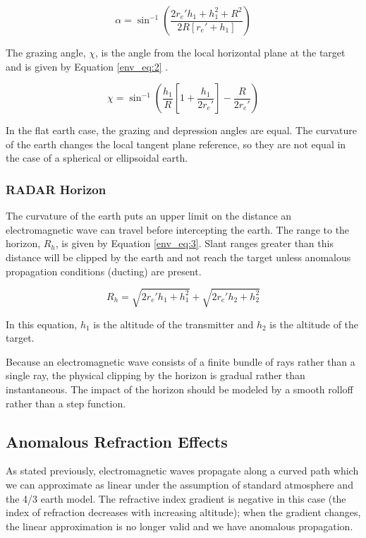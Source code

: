 \begin{equation}
  \label{env_eq:1}
  \alpha = \sin^{-1}\left(\frac{2r_e'h_1 + h_1^2 + R^2}{2R\left[r_e' + h_1 \right]} \right)
  \end{equation}
  \renewcommand{\baselinestretch}{2} \small\normalsize
  
The grazing angle, $\chi$, is the angle from the local horizontal plane at the target and is given by Equation \ref{env_eq:2} \cite{nathanson_radar}.

  \begin{equation}
  \label{env_eq:2}
  \chi = \sin^{-1}\left(\frac{h_1}{R}\left[1 + \frac{h_1}{2r_e'} \right] - \frac{R}{2r_e'} \right)
  \end{equation}
  \renewcommand{\baselinestretch}{2} \small\normalsize
  
In the flat earth case, the grazing and depression angles are equal. The curvature of the earth changes the local tangent plane reference, so they are not equal in the case of a spherical or ellipsoidal earth.
  
\subsubsection{RADAR Horizon}
The curvature of the earth puts an upper limit on the distance an electromagnetic wave can travel before intercepting the earth. The range to the horizon, $R_h$, is given by Equation \ref{env_eq:3}. Slant ranges greater than this distance will be clipped by the earth and not reach the target unless anomalous propagation conditions (ducting) are present.

  \begin{equation}
  \label{env_eq:3}
  R_h = \sqrt{2r_e'h_1 + h_1^2} + \sqrt{2r_e'h_2 + h_2^2}
  \end{equation}
  \renewcommand{\baselinestretch}{2} \small\normalsize
  
In this equation, $h_1$ is the altitude of the transmitter and $h_2$ is the altitude of the target.

Because an electromagnetic wave consists of a finite bundle of rays rather than a single ray, the physical clipping by the horizon is gradual rather than instantaneous. The impact of the horizon should be modeled by a smooth rolloff rather than a step function.
  
\subsection{Anomalous Refraction Effects}
As stated previously, electromagnetic waves propagate along a curved path which we can approximate as linear under the assumption of standard atmosphere and the 4/3 earth model. The refractive index gradient is negative in this case (the index of refraction decreases with increasing altitude); when the gradient changes, the linear approximation is no longer valid and we have anomalous propagation. 

